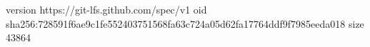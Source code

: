 version https://git-lfs.github.com/spec/v1
oid sha256:728591f6ae9c1fe552403751568fa63c724a05d62fa17764ddf9f7985eeda018
size 43864
